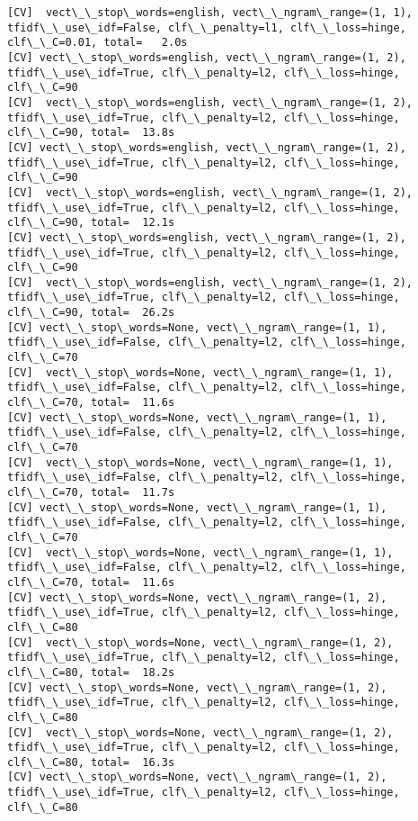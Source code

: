 \documentclass[11pt]{article}
\begin{document}
    \begin{Verbatim}[commandchars=\\\{\}]
[CV]  vect\_\_stop\_words=english, vect\_\_ngram\_range=(1, 1), tfidf\_\_use\_idf=False, clf\_\_penalty=l1, clf\_\_loss=hinge, clf\_\_C=0.01, total=   2.0s
[CV] vect\_\_stop\_words=english, vect\_\_ngram\_range=(1, 2), tfidf\_\_use\_idf=True, clf\_\_penalty=l2, clf\_\_loss=hinge, clf\_\_C=90 
[CV]  vect\_\_stop\_words=english, vect\_\_ngram\_range=(1, 2), tfidf\_\_use\_idf=True, clf\_\_penalty=l2, clf\_\_loss=hinge, clf\_\_C=90, total=  13.8s
[CV] vect\_\_stop\_words=english, vect\_\_ngram\_range=(1, 2), tfidf\_\_use\_idf=True, clf\_\_penalty=l2, clf\_\_loss=hinge, clf\_\_C=90 
[CV]  vect\_\_stop\_words=english, vect\_\_ngram\_range=(1, 2), tfidf\_\_use\_idf=True, clf\_\_penalty=l2, clf\_\_loss=hinge, clf\_\_C=90, total=  12.1s
[CV] vect\_\_stop\_words=english, vect\_\_ngram\_range=(1, 2), tfidf\_\_use\_idf=True, clf\_\_penalty=l2, clf\_\_loss=hinge, clf\_\_C=90 
[CV]  vect\_\_stop\_words=english, vect\_\_ngram\_range=(1, 2), tfidf\_\_use\_idf=True, clf\_\_penalty=l2, clf\_\_loss=hinge, clf\_\_C=90, total=  26.2s
[CV] vect\_\_stop\_words=None, vect\_\_ngram\_range=(1, 1), tfidf\_\_use\_idf=False, clf\_\_penalty=l2, clf\_\_loss=hinge, clf\_\_C=70 
[CV]  vect\_\_stop\_words=None, vect\_\_ngram\_range=(1, 1), tfidf\_\_use\_idf=False, clf\_\_penalty=l2, clf\_\_loss=hinge, clf\_\_C=70, total=  11.6s
[CV] vect\_\_stop\_words=None, vect\_\_ngram\_range=(1, 1), tfidf\_\_use\_idf=False, clf\_\_penalty=l2, clf\_\_loss=hinge, clf\_\_C=70 
[CV]  vect\_\_stop\_words=None, vect\_\_ngram\_range=(1, 1), tfidf\_\_use\_idf=False, clf\_\_penalty=l2, clf\_\_loss=hinge, clf\_\_C=70, total=  11.7s
[CV] vect\_\_stop\_words=None, vect\_\_ngram\_range=(1, 1), tfidf\_\_use\_idf=False, clf\_\_penalty=l2, clf\_\_loss=hinge, clf\_\_C=70 
[CV]  vect\_\_stop\_words=None, vect\_\_ngram\_range=(1, 1), tfidf\_\_use\_idf=False, clf\_\_penalty=l2, clf\_\_loss=hinge, clf\_\_C=70, total=  11.6s
[CV] vect\_\_stop\_words=None, vect\_\_ngram\_range=(1, 2), tfidf\_\_use\_idf=True, clf\_\_penalty=l2, clf\_\_loss=hinge, clf\_\_C=80 
[CV]  vect\_\_stop\_words=None, vect\_\_ngram\_range=(1, 2), tfidf\_\_use\_idf=True, clf\_\_penalty=l2, clf\_\_loss=hinge, clf\_\_C=80, total=  18.2s
[CV] vect\_\_stop\_words=None, vect\_\_ngram\_range=(1, 2), tfidf\_\_use\_idf=True, clf\_\_penalty=l2, clf\_\_loss=hinge, clf\_\_C=80 
[CV]  vect\_\_stop\_words=None, vect\_\_ngram\_range=(1, 2), tfidf\_\_use\_idf=True, clf\_\_penalty=l2, clf\_\_loss=hinge, clf\_\_C=80, total=  16.3s
[CV] vect\_\_stop\_words=None, vect\_\_ngram\_range=(1, 2), tfidf\_\_use\_idf=True, clf\_\_penalty=l2, clf\_\_loss=hinge, clf\_\_C=80 

\end{Verbatim}
\end{document}

